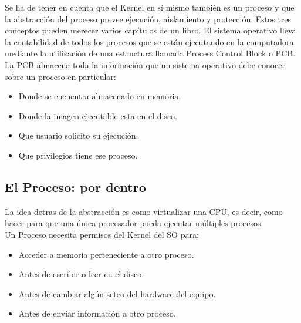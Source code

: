 \documentclass[../main.tex]{subfiles}
\begin{document}
            Se ha de tener en cuenta que el Kernel en sí mismo también es un proceso y que la abstracción del proceso provee ejecución, aislamiento y protección. Estos tres conceptos pueden merecer varios capítulos de un libro. El sistema operativo lleva la contabilidad de todos los procesos que se están ejecutando en la computadora mediante la utilización de una estructura llamada Process Control Block o PCB. La PCB almacena toda la información que un sistema operativo debe conocer sobre un proceso en particular:

            \begin{itemize}
                \item Donde se encuentra almacenado en memoria.
                \item Donde la imagen ejecutable esta en el disco.
                \item Que usuario solicito su ejecución.
                \item Que privilegios tiene ese proceso.
            \end{itemize}

        \subsection*{El Proceso: por dentro}
            La idea detras de la abstracción es como virtualizar una CPU, es decir, como hacer para que una única procesador pueda ejecutar múltiples procesos.\\

            Un Proceso necesita permisos del Kernel del SO para:
            \begin{itemize}
                \item Acceder a memoria perteneciente a otro proceso.
                \item Antes de escribir o leer en el disco.
                \item Antes de cambiar algún seteo del hardware del equipo.
                \item Antes de enviar información a otro proceso.
            \end{itemize}
\end{document}
